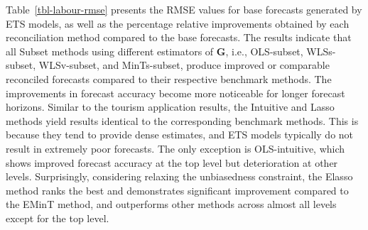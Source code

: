 \documentclass[11pt,a4paper,]{article}
\begin{document}
Table~\ref{tbl-labour-rmse} presents the RMSE values for base forecasts
generated by ETS models, as well as the percentage relative improvements
obtained by each reconciliation method compared to the base forecasts.
The results indicate that all Subset methods using different estimators
of \(\boldsymbol{G}\), i.e., OLS-subset, WLSs-subset, WLSv-subset, and
MinTs-subset, produce improved or comparable reconciled forecasts
compared to their respective benchmark methods. The improvements in
forecast accuracy become more noticeable for longer forecast horizons.
Similar to the tourism application results, the Intuitive and Lasso
methods yield results identical to the corresponding benchmark methods.
This is because they tend to provide dense estimates, and ETS models
typically do not result in extremely poor forecasts. The only exception
is OLS-intuitive, which shows improved forecast accuracy at the top
level but deterioration at other levels. Surprisingly, considering
relaxing the unbiasedness constraint, the Elasso method ranks the best
and demonstrates significant improvement compared to the EMinT method,
and outperforms other methods across almost all levels except for the
top level.
\end{document}
